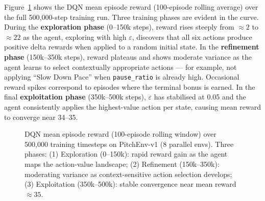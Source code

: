 \documentclass{article}
\begin{document}
Figure~\ref{fig:reward_curve} shows the DQN mean episode reward (100-episode
rolling average) over the full 500{,}000-step training run.
Three training phases are evident in the curve.
During the \textbf{exploration phase} (0--150k steps), reward rises steeply
from $\approx\!2$ to $\approx\!22$ as the agent, exploring with high
$\varepsilon$, discovers that all six actions produce positive delta rewards
when applied to a random initial state.
In the \textbf{refinement phase} (150k--350k steps), reward plateaus and shows
moderate variance as the agent learns to select contextually appropriate
actions --- for example, not applying ``Slow Down Pace'' when
\texttt{pause\_ratio} is already high. Occasional reward spikes
correspond to episodes where the terminal bonus is earned.
In the final \textbf{exploitation phase} (350k--500k steps), $\varepsilon$
has stabilised at 0.05 and the agent consistently applies the highest-value
action per state, causing mean reward to converge near 34--35.

\begin{figure}[htbp]
\centering
{}
\caption{DQN mean episode reward (100-episode rolling window) over
         500{,}000 training timesteps on PitchEnv-v1 (8 parallel envs).
         Three phases: (1) Exploration (0--150k): rapid reward gain as
         the agent maps the action-value landscape; (2) Refinement
         (150k--350k): moderating variance as context-sensitive action
         selection develops; (3) Exploitation (350k--500k): stable convergence
         near mean reward $\approx 35$.}
\label{fig:reward_curve}
\end{figure}
\end{document}
